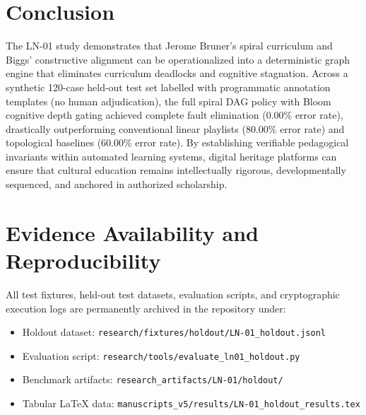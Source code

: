 \documentclass[11pt,a4paper]{article}
\begin{document}
\section{Conclusion}

The LN-01 study demonstrates that Jerome Bruner's spiral curriculum and Biggs' constructive alignment can be operationalized into a deterministic graph engine that eliminates curriculum deadlocks and cognitive stagnation. Across a synthetic 120-case held-out test set labelled with programmatic annotation templates (no human adjudication), the full spiral DAG policy with Bloom cognitive depth gating achieved complete fault elimination (0.00\% error rate), drastically outperforming conventional linear playlists (80.00\% error rate) and topological baselines (60.00\% error rate). By establishing verifiable pedagogical invariants within automated learning systems, digital heritage platforms can ensure that cultural education remains intellectually rigorous, developmentally sequenced, and anchored in authorized scholarship.

\section*{Evidence Availability and Reproducibility}
All test fixtures, held-out test datasets, evaluation scripts, and cryptographic execution logs are permanently archived in the repository under:
\begin{itemize}
    \item Holdout dataset: \texttt{research/fixtures/holdout/LN-01\_holdout.jsonl}
    \item Evaluation script: \texttt{research/tools/evaluate\_ln01\_holdout.py}
    \item Benchmark artifacts: \texttt{research\_artifacts/LN-01/holdout/}
    \item Tabular LaTeX data: \texttt{manuscripts\_v5/results/LN-01\_holdout\_results.tex}
\end{itemize}
\end{document}
